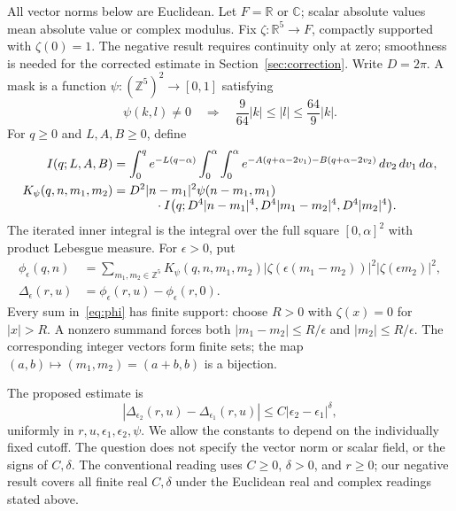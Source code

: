 \documentclass[11pt]{article}
\newcommand{\R}{\mathbb R}
\newcommand{\Z}{\mathbb Z}
\newcommand{\C}{\mathbb C}
\begin{document}
All vector norms below are Euclidean. Let $F=\R$ or $\C$; scalar
absolute values mean absolute value or complex modulus. Fix
$\zeta:\R^5\to F$, compactly supported with $\zeta(0)=1$.
The negative result requires continuity only at zero; smoothness is
needed for the corrected estimate in Section~\ref{sec:correction}.
Write $D=2\pi$. A mask is a function
$\psi:(\Z^5)^2\to[0,1]$ satisfying
\begin{equation}\label{eq:mask}
 \psi(k,l)\ne0\quad\Longrightarrow\quad
 \frac9{64}|k|\le |l|\le\frac{64}9|k|.
\end{equation}
For $q\ge0$ and $L,A,B\ge0$, define
\begin{align}
 I(q;L,A,B)&=\int_0^q e^{-L(q-\alpha)}
 \int_0^\alpha\int_0^\alpha
 e^{-A(q+\alpha-2v_1)-B(q+\alpha-2v_2)}\,dv_2\,dv_1\,d\alpha,
 \label{eq:integral}\\
 K_\psi(q,n,m_1,m_2)&=D^2|n-m_1|^2\psi(n-m_1,m_1)
 \notag\\[-4pt]
 &\hspace{12mm}\cdot I\bigl(q;D^4|n-m_1|^4,D^4|m_1-m_2|^4,D^4|m_2|^4\bigr).
 \label{eq:kernel}
\end{align}
The iterated inner integral is the integral over the full square
$[0,\alpha]^2$ with product Lebesgue measure. For $\epsilon>0$, put
\begin{align}
 \phi_\epsilon(q,n)&=\sum_{m_1,m_2\in\Z^5}
 K_\psi(q,n,m_1,m_2)
 |\zeta(\epsilon(m_1-m_2))|^2|\zeta(\epsilon m_2)|^2,
 \label{eq:phi}\\
 \Delta_\epsilon(r,u)&=\phi_\epsilon(r,u)-\phi_\epsilon(r,0).
 \label{eq:delta}
\end{align}
Every sum in~\eqref{eq:phi} has finite support: choose $R>0$ with
$\zeta(x)=0$ for $|x|>R$. A nonzero summand forces both
$|m_1-m_2|\le R/\epsilon$ and $|m_2|\le R/\epsilon$.
The corresponding integer vectors form finite sets; the map
$(a,b)\mapsto(m_1,m_2)=(a+b,b)$ is a bijection.

The proposed estimate is
\begin{equation}\label{eq:asked}
 |\Delta_{\epsilon_2}(r,u)-\Delta_{\epsilon_1}(r,u)|
 \le C|\epsilon_2-\epsilon_1|^\delta,
\end{equation}
uniformly in $r,u,\epsilon_1,\epsilon_2,\psi$. We allow the constants
to depend on the individually fixed cutoff. The question does not specify
the vector norm or scalar field, or the signs of $C,\delta$.
The conventional reading uses $C\ge0$, $\delta>0$, and $r\ge0$;
our negative result covers all finite real $C,\delta$ under the
Euclidean real and complex readings stated above.
\end{document}

